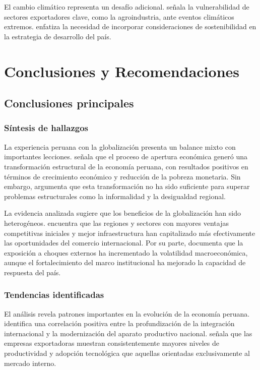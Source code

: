 \documentclass[12pt, a4paper]{article}
\begin{document}
El cambio climático representa un desafío adicional. \textcite{vargas2020clima} señala la vulnerabilidad de sectores exportadores clave, como la agroindustria, ante eventos climáticos extremos. \textcite{sanchez2021adaptacion} enfatiza la necesidad de incorporar consideraciones de sostenibilidad en la estrategia de desarrollo del país.

\section{Conclusiones y Recomendaciones}

\subsection{Conclusiones principales}

\subsubsection{Síntesis de hallazgos}
La experiencia peruana con la globalización presenta un balance mixto con importantes lecciones. \textcite{seminario2022balance} señala que el proceso de apertura económica generó una transformación estructural de la economía peruana, con resultados positivos en términos de crecimiento económico y reducción de la pobreza monetaria. Sin embargo, \textcite{paz2021desafios} argumenta que esta transformación no ha sido suficiente para superar problemas estructurales como la informalidad y la desigualdad regional.

La evidencia analizada sugiere que los beneficios de la globalización han sido heterogéneos. \textcite{vega2021disparidades} encuentra que las regiones y sectores con mayores ventajas competitivas iniciales y mejor infraestructura han capitalizado más efectivamente las oportunidades del comercio internacional. Por su parte, \textcite{torres2020vulnerabilidad} documenta que la exposición a choques externos ha incrementado la volatilidad macroeconómica, aunque el fortalecimiento del marco institucional ha mejorado la capacidad de respuesta del país.

\subsubsection{Tendencias identificadas}
El análisis revela patrones importantes en la evolución de la economía peruana. \textcite{parodi2021tendencias} identifica una correlación positiva entre la profundización de la integración internacional y la modernización del aparato productivo nacional. \textcite{contreras2022perspectivas} señala que las empresas exportadoras muestran consistentemente mayores niveles de productividad y adopción tecnológica que aquellas orientadas exclusivamente al mercado interno.
\end{document}
